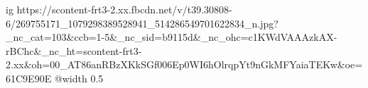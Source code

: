  
 
 
 
 

\ifcmt
  ig https://scontent-frt3-2.xx.fbcdn.net/v/t39.30808-6/269755171_1079298389528941_514286549701622834_n.jpg?_nc_cat=103&ccb=1-5&_nc_sid=b9115d&_nc_ohc=c1KWdVAAAzkAX-rBChc&_nc_ht=scontent-frt3-2.xx&oh=00_AT86anRBzXKkSGf006Ep0WI6hOlrqpYt9nGkMFYaiaTEKw&oe=61C9E90E
  @width 0.5
\fi
